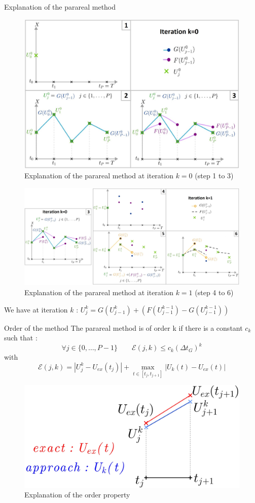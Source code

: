 \begin{frame}[allowframebreaks]{Explanation of the parareal method}
	\begin{figure}
		\centering
		\includegraphics[width=0.6\linewidth]{images/parareal/parareal_k0.jpg}
		\caption{Explanation of the parareal method at iteration $k=0$ (step 1 to 3)}
	\end{figure}
	\begin{figure}
		\centering
		\includegraphics[width=0.9\linewidth]{images/parareal/parareal_k1.jpg}
		\caption{Explanation of the parareal method at iteration $k=1$ (step 4 to 6)}
	\end{figure}
	\small
	We have at iteration $k$ : \qquad	$U_j^k=G(U_{j-1}^k)+(F(U_{j-1}^{k-1})-G(U_{j-1}^{k-1}))$
\end{frame}

\begin{frame}{Order of the method}
	The parareal method is of order k if there is a constant $c_k$ such that :
	\begin{equation*}
		\forall j\in\{0,\dots,P-1\} \qquad \mathcal{E}(j,k)\le c_k(\Delta t_G)^k
	\end{equation*}
	with
	$$\mathcal{E}(j,k)=|U_j^k-U_{ex}(t_j)|+\max_{t\in[t_j,t_{j+1}]}|U_k(t)-U_{ex}(t)|$$
	\begin{figure}
		\centering
		\includegraphics[width=0.62\linewidth]{images/parareal/explane_order.jpg}
		\caption{Explanation of the order property}
	\end{figure}
\end{frame}

